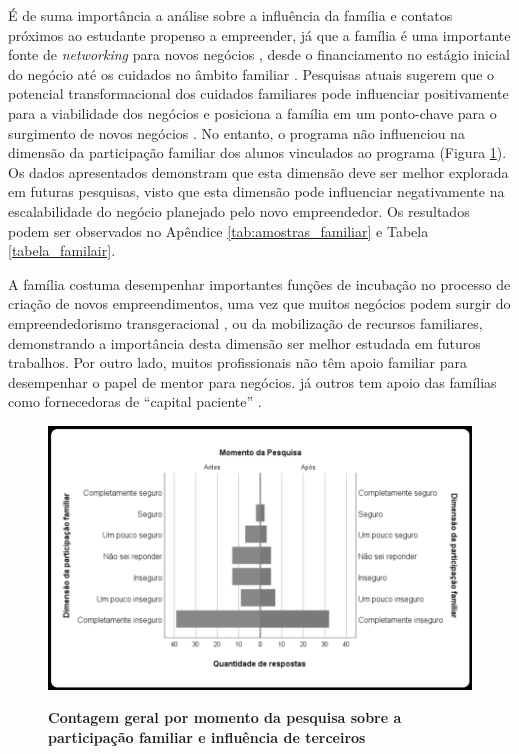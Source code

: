 É de suma importância a análise sobre a influência da família e contatos próximos ao estudante propenso a empreender, já que a família é uma importante fonte de \textit{networking} para novos negócios \cite{soto_does_2019,raza_influence_2019,kupp_when_2019}, desde o financiamento no estágio inicial do negócio \cite{soto_does_2019,edelman_impact_2016} até os cuidados no âmbito familiar \cite{meliou_family_2020}  \cite{puzi_transgenerational_2020}. Pesquisas atuais sugerem que o potencial transformacional dos cuidados familiares pode influenciar positivamente para a viabilidade dos negócios e posiciona a família em um ponto-chave para o surgimento de novos negócios \cite{georgescu_impact_2020,jena_measuring_2020,porfirio_family_2020}. No entanto, o programa não influenciou na dimensão da participação familiar dos alunos vinculados ao programa (Figura \ref{figura_60}). Os dados apresentados demonstram que esta dimensão deve ser melhor explorada em futuras pesquisas, visto que esta dimensão pode influenciar negativamente na escalabilidade do negócio planejado pelo novo empreendedor. Os resultados podem ser observados no Apêndice \ref{tab:amostras_familiar} e Tabela \ref{tabela_familair}.


A família costuma desempenhar importantes funções de incubação no processo de criação de novos empreendimentos, uma vez que muitos negócios podem surgir do empreendedorismo transgeracional \cite{puzi_transgenerational_2020,meliou_family_2020}, ou da mobilização de recursos familiares, demonstrando a importância desta dimensão ser melhor estudada em futuros trabalhos. Por outro lado, muitos profissionais não têm apoio familiar para desempenhar o papel de mentor para negócios. já outros tem apoio das famílias como fornecedoras de “capital paciente” \cite{lumpkin_longterm_2011}.


\begin{figure}[H]
\centering
\caption{\textbf{Contagem geral por momento da pesquisa sobre a participação familiar e influência de terceiros}}
\includegraphics[scale=0.4]{Imagens/dimensao_familiar.png}
\label{figura_60}
\end{figure}


